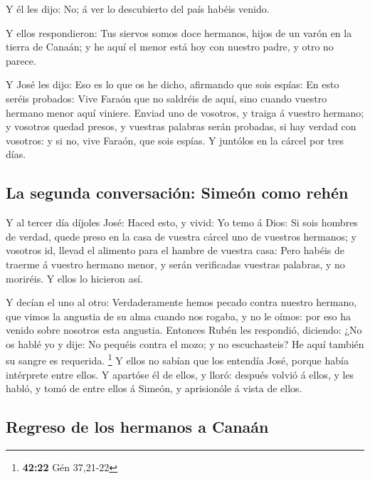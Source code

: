  Y él les dijo: No; á ver lo descubierto del país habéis
venido.

 Y ellos respondieron: Tus siervos somos doce hermanos,
hijos de un varón en la tierra de Canaán; y he aquí el menor está hoy
con nuestro padre, y otro no parece.

 Y José les dijo: Eso es lo que os he dicho, afirmando que
sois espías:  En esto seréis probados: Vive Faraón que no
saldréis de aquí, sino cuando vuestro hermano menor aquí viniere.
 Enviad uno de vosotros, y traiga á vuestro hermano; y
vosotros quedad presos, y vuestras palabras serán probadas, si hay
verdad con vosotros: y si no, vive Faraón, que sois espías.
 Y juntólos en la cárcel por tres días.

\hypertarget{la-segunda-conversaciuxf3n-simeuxf3n-como-rehuxe9n}{%
\subsection{La segunda conversación: Simeón como
rehén}\label{la-segunda-conversaciuxf3n-simeuxf3n-como-rehuxe9n}}

 Y al tercer día díjoles José: Haced esto, y vivid: Yo temo
á Dios:  Si sois hombres de verdad, quede preso en la casa
de vuestra cárcel uno de vuestros hermanos; y vosotros id, llevad el
alimento para el hambre de vuestra casa:  Pero habéis de
traerme á vuestro hermano menor, y serán verificadas vuestras palabras,
y no moriréis. Y ellos lo hicieron así.

 Y decían el uno al otro: Verdaderamente hemos pecado
contra nuestro hermano, que vimos la angustia de su alma cuando nos
rogaba, y no le oímos: por eso ha venido sobre nosotros esta angustia.
 Entonces Rubén les respondió, diciendo: ¿No os hablé yo y
dije: No pequéis contra el mozo; y no escuchasteis? He aquí también su
sangre es requerida. \footnote{\textbf{42:22} Gén 37,21-22}
 Y ellos no sabían que los entendía José, porque había
intérprete entre ellos.  Y apartóse él de ellos, y lloró:
después volvió á ellos, y les habló, y tomó de entre ellos á Simeón, y
aprisionóle á vista de ellos.

\hypertarget{regreso-de-los-hermanos-a-canauxe1n}{%
\subsection{Regreso de los hermanos a
Canaán}\label{regreso-de-los-hermanos-a-canauxe1n}}

